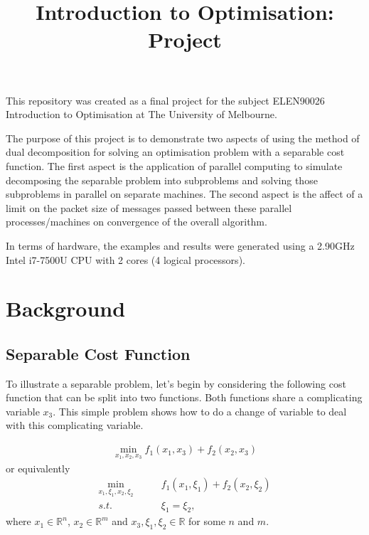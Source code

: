 \documentclass[12pt]{article}
\begin{document}
\title{Introduction to Optimisation: Project}
\author{}
\date{}
\maketitle

This repository was created as a final project for the subject ELEN90026 Introduction to Optimisation at The University of Melbourne.

The purpose of this project is to demonstrate two aspects of using the method of dual decomposition for solving an optimisation problem with a separable cost function. The first aspect is the application of parallel computing to simulate decomposing the separable problem into subproblems and solving those subproblems in parallel on separate machines. The second aspect is the affect of a limit on the packet size of messages passed between these parallel processes/machines on convergence of the overall algorithm.

In terms of hardware, the examples and results were generated using a 2.90GHz Intel i7-7500U CPU with 2 cores (4 logical processors).

\section*{Background}

\subsection*{Separable Cost Function}
To illustrate a separable problem, let's begin by considering the following cost function that can be split into two functions. Both functions share a complicating variable $x_3$. This simple problem shows how to do a change of variable to deal with this complicating variable.

\begin{align*}
\min_{x_1,x_2,x_3}f_1(x_1,x_3)+f_2(x_2,x_3)
\end{align*}
or equivalently
\begin{align*}
\min_{x_1,\xi_1,x_2,\xi_2}\qquad&f_1(x_1,\xi_1)+f_2(x_2,\xi_2)\\
s.t.\qquad&\xi_1=\xi_2,
\end{align*}
where $x_1\in\mathbb{R}^n$, $x_2\in\mathbb{R}^m$ and $x_3,\xi_1,\xi_2\in\mathbb{R}$ for some $n$ and $m$.
\end{document}
